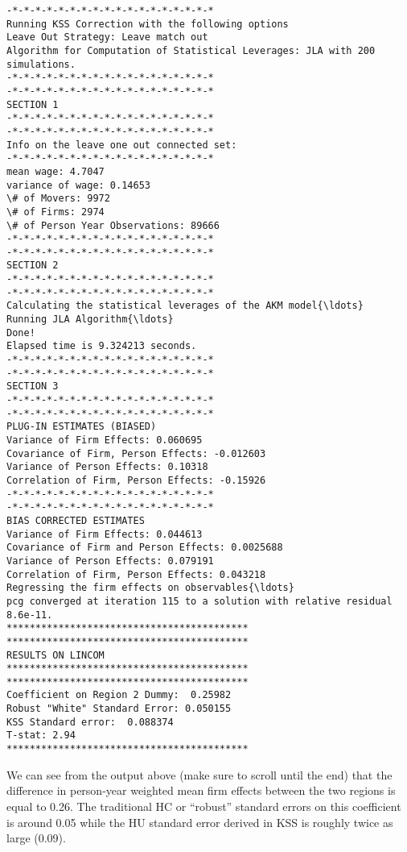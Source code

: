 \documentclass[11pt]{article}
\begin{document}
    \begin{Verbatim}[commandchars=\\\{\}]
-*-*-*-*-*-*-*-*-*-*-*-*-*-*-*-*-*-*
Running KSS Correction with the following options
Leave Out Strategy: Leave match out
Algorithm for Computation of Statistical Leverages: JLA with 200 simulations.
-*-*-*-*-*-*-*-*-*-*-*-*-*-*-*-*-*-*
-*-*-*-*-*-*-*-*-*-*-*-*-*-*-*-*-*-*
SECTION 1
-*-*-*-*-*-*-*-*-*-*-*-*-*-*-*-*-*-*
-*-*-*-*-*-*-*-*-*-*-*-*-*-*-*-*-*-*
Info on the leave one out connected set:
-*-*-*-*-*-*-*-*-*-*-*-*-*-*-*-*-*-*
mean wage: 4.7047
variance of wage: 0.14653
\# of Movers: 9972
\# of Firms: 2974
\# of Person Year Observations: 89666
-*-*-*-*-*-*-*-*-*-*-*-*-*-*-*-*-*-*
-*-*-*-*-*-*-*-*-*-*-*-*-*-*-*-*-*-*
SECTION 2
-*-*-*-*-*-*-*-*-*-*-*-*-*-*-*-*-*-*
-*-*-*-*-*-*-*-*-*-*-*-*-*-*-*-*-*-*
Calculating the statistical leverages of the AKM model{\ldots}
Running JLA Algorithm{\ldots}
Done!
Elapsed time is 9.324213 seconds.
-*-*-*-*-*-*-*-*-*-*-*-*-*-*-*-*-*-*
-*-*-*-*-*-*-*-*-*-*-*-*-*-*-*-*-*-*
SECTION 3
-*-*-*-*-*-*-*-*-*-*-*-*-*-*-*-*-*-*
-*-*-*-*-*-*-*-*-*-*-*-*-*-*-*-*-*-*
PLUG-IN ESTIMATES (BIASED)
Variance of Firm Effects: 0.060695
Covariance of Firm, Person Effects: -0.012603
Variance of Person Effects: 0.10318
Correlation of Firm, Person Effects: -0.15926
-*-*-*-*-*-*-*-*-*-*-*-*-*-*-*-*-*-*
-*-*-*-*-*-*-*-*-*-*-*-*-*-*-*-*-*-*
BIAS CORRECTED ESTIMATES
Variance of Firm Effects: 0.044613
Covariance of Firm and Person Effects: 0.0025688
Variance of Person Effects: 0.079191
Correlation of Firm, Person Effects: 0.043218
Regressing the firm effects on observables{\ldots}
pcg converged at iteration 115 to a solution with relative residual 8.6e-11.
******************************************
******************************************
RESULTS ON LINCOM
******************************************
******************************************
Coefficient on Region 2 Dummy:  0.25982
Robust "White" Standard Error: 0.050155
KSS Standard error:  0.088374
T-stat: 2.94
******************************************
    \end{Verbatim}

    We can see from the output above (make sure to scroll until the end)
that the difference in person-year weighted mean firm effects between
the two regions is equal to 0.26. The traditional
HC or ``robust'' standard errors on this
coefficient is around 0.05 while the HU standard error derived in KSS is
roughly twice as large (0.09).


    
    
\end{document}
